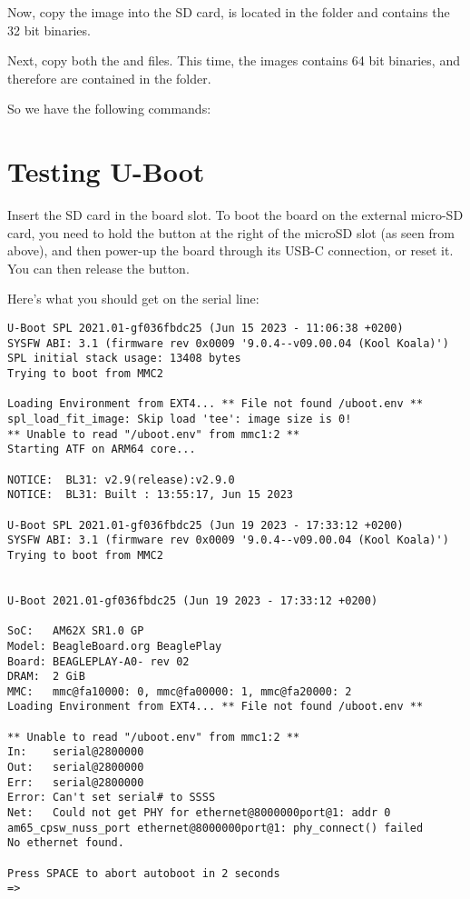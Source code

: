 Now, copy the  image into the SD card,
 is located in the
folder and contains the 32 bit binaries.

Next, copy both the  and  files.
This time, the images contains 64 bit binaries, and therefore are contained
in the 
folder.

So we have the following commands:

\section{Testing U-Boot}

Insert the SD card in the board slot. To boot the board on the external micro-SD
card, you need to hold the  button at the right of the
microSD slot (as seen from above), and then power-up the board through
its USB-C connection, or reset it. You can then release the
 button.

Here's what you should get on the serial line:

\begin{verbatim}
U-Boot SPL 2021.01-gf036fbdc25 (Jun 15 2023 - 11:06:38 +0200)
SYSFW ABI: 3.1 (firmware rev 0x0009 '9.0.4--v09.00.04 (Kool Koala)')
SPL initial stack usage: 13408 bytes
Trying to boot from MMC2

Loading Environment from EXT4... ** File not found /uboot.env **
spl_load_fit_image: Skip load 'tee': image size is 0!
** Unable to read "/uboot.env" from mmc1:2 **
Starting ATF on ARM64 core...

NOTICE:  BL31: v2.9(release):v2.9.0
NOTICE:  BL31: Built : 13:55:17, Jun 15 2023

U-Boot SPL 2021.01-gf036fbdc25 (Jun 19 2023 - 17:33:12 +0200)
SYSFW ABI: 3.1 (firmware rev 0x0009 '9.0.4--v09.00.04 (Kool Koala)')
Trying to boot from MMC2


U-Boot 2021.01-gf036fbdc25 (Jun 19 2023 - 17:33:12 +0200)

SoC:   AM62X SR1.0 GP
Model: BeagleBoard.org BeaglePlay
Board: BEAGLEPLAY-A0- rev 02
DRAM:  2 GiB
MMC:   mmc@fa10000: 0, mmc@fa00000: 1, mmc@fa20000: 2
Loading Environment from EXT4... ** File not found /uboot.env **

** Unable to read "/uboot.env" from mmc1:2 **
In:    serial@2800000
Out:   serial@2800000
Err:   serial@2800000
Error: Can't set serial# to SSSS
Net:   Could not get PHY for ethernet@8000000port@1: addr 0
am65_cpsw_nuss_port ethernet@8000000port@1: phy_connect() failed
No ethernet found.

Press SPACE to abort autoboot in 2 seconds
=>
\end{verbatim}

